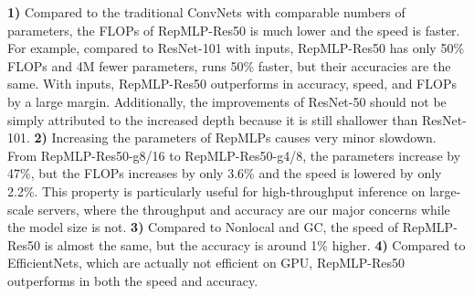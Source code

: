 \documentclass[10pt,twocolumn,letterpaper]{article}
\begin{document}
\textbf{1)} Compared to the traditional ConvNets with comparable numbers of parameters, the FLOPs of RepMLP-Res50 is much lower and the speed is faster. For example, compared to ResNet-101 with  inputs, RepMLP-Res50 has only 50\% FLOPs and 4M fewer parameters, runs 50\% faster, but their accuracies are the same. With  inputs, RepMLP-Res50 outperforms in accuracy, speed, and FLOPs by a large margin. Additionally, the improvements of ResNet-50 should not be simply attributed to the increased depth because it is still shallower than ResNet-101. \textbf{2)} Increasing the parameters of RepMLPs causes very minor slowdown. From RepMLP-Res50-g8/16 to RepMLP-Res50-g4/8, the parameters increase by 47\%, but the FLOPs increases by only 3.6\% and the speed is lowered by only 2.2\%. This property is particularly useful for high-throughput inference on large-scale servers, where the throughput and accuracy are our major concerns while the model size is not. \textbf{3)} Compared to Nonlocal and GC, the speed of RepMLP-Res50 is almost the same, but the accuracy is around 1\% higher. \textbf{4)} Compared to EfficientNets, which are actually not efficient on GPU, RepMLP-Res50 outperforms in both the speed and accuracy.
\end{document}
